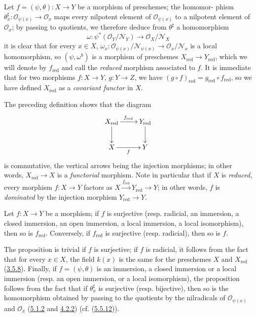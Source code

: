 \begin{env}[5.1.5]
\label{I.5.1.5}
Let $f=(\psi,\theta):X\to Y$ be a morphism of preschemes; the homomor-
phism $\theta_x^\sharp:\mathscr{O}_{\psi(x)}\to\mathscr{O}_x$ maps every
nilpotent element of $\mathscr{O}_{\psi(x)}$ to a nilpotent element of
$\mathscr{O}_x$; by passing to quotients, we therefore deduce from
$\theta^\sharp$ a homomorphism
\[
  \omega:\psi^*(\mathscr{O}_Y/\mathscr{N}_Y)
  \longrightarrow \mathscr{O}_X/\mathscr{N}_X
\]
it is clear that for every $x\in X$,
$\omega_x:\mathscr{O}_{\psi(x)}/\mathscr{N}_{\psi(x)}
\to\mathscr{O}_x/\mathscr{N}_x$ is a local homomorphism, so
$(\psi,\omega^b)$ is a morphism of preschemes
$X_{\mathrm{red}}\to Y_{\mathrm{red}}$, which we will denote by
$f_{\mathrm{red}}$ and call the \emph{reduced} morphism associated to $f$. It
is immediate that for two morphisms $f:X\to Y$, $g:Y\to Z$, we have
$(g\circ f)_{\mathrm{red}}=g_{\mathrm{red}}\circ f_{\mathrm{red}}$, so we have
defined $X_{\mathrm{red}}$ as a \emph{covariant functor} in $X$.

The preceding definition shows that the diagram
\[
  \xymatrix{
    X_{\mathrm{red}}\ar[r]^{f_{\mathrm{red}}}\ar[d] &
    Y_{\mathrm{red}}\ar[d]\\
    X\ar[r]_f & Y
  }
\]
is commutative, the vertical arrows being the injection morphisms; in
other words, $X_{\mathrm{red}}\to X$ is a \emph{functorial} morphism.
Note in particular that if $X$ is \emph{reduced}, every morphism
$f:X\to Y$ factors as
$X\xrightarrow{f_{\mathrm{red}}}Y_{\mathrm{red}}\to Y$; in other words,
$f$ is \emph{dominated} by the injection morphism
$Y_{\mathrm{red}}\to Y$.
\end{env}

\begin{proposition}[5.1.6]
\label{I.5.1.6}
Let $f:X\to Y$ be a morphism; if $f$ is surjective (resp. radicial, an
immersion, a closed immersion, an open immersion, a local immersion,
a local isomorphism), then so is $f_{\mathrm{red}}$. Conversely,
if $f_{\mathrm{red}}$ is surjective (resp. radicial), then so is
$f$.
\end{proposition}

The proposition is trivial if $f$ is surjective; if $f$ is radicial, it
follows from the fact that for every $x\in X$, the field $k(x)$ is the same
for the preschemes $X$ and $X_{\mathrm{red}}$
(\hyperref[I.3.5.8]{3.5.8}). Finally, if $f=(\psi,\theta)$ is an
immersion, a closed immersion or a local immersion (resp. an open immersion,
or a local isomorphism), the proposition follows from the fact that if
$\theta_x^\sharp$ is surjective (resp. bijective), then so is the
homomorphism obtained by passing to the quotients by the nilradicals of
$\mathscr{O}_{\psi(x)}$ and $\mathscr{O}_x$
(\hyperref[I.5.1.2]{5.1.2} and \hyperref[I.4.2.2]{4.2.2})
(cf. (\hyperref[I.5.5.12]{5.5.12})).

